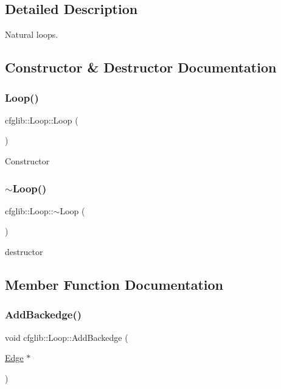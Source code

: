 \subsection{Detailed Description}
Natural loops. 

\subsection{Constructor \& Destructor Documentation}
\mbox{\label{classcfglib_1_1Loop_a14d3e2db416417b9a0debad435307fb6}} 
\subsubsection{\texorpdfstring{Loop()}{Loop()}}
{\footnotesize\ttfamily cfglib\+::\+Loop\+::\+Loop (\begin{DoxyParamCaption}{ }\end{DoxyParamCaption})}

Constructor \mbox{\label{classcfglib_1_1Loop_a7ce83c4b6b9fca7d2c4c86dfce6f4197}} 
\subsubsection{\texorpdfstring{$\sim$\+Loop()}{~Loop()}}
{\footnotesize\ttfamily cfglib\+::\+Loop\+::$\sim$\+Loop (\begin{DoxyParamCaption}{ }\end{DoxyParamCaption})}

destructor 

\subsection{Member Function Documentation}
\mbox{\label{classcfglib_1_1Loop_a2d327d15a95feaa19e09b83a1cf6a496}} 
\subsubsection{\texorpdfstring{Add\+Backedge()}{AddBackedge()}}
{\footnotesize\ttfamily void cfglib\+::\+Loop\+::\+Add\+Backedge (\begin{DoxyParamCaption}\item[{\hyperlink{classcfglib_1_1Edge}{Edge} $\ast$}]{ }\end{DoxyParamCaption})}


